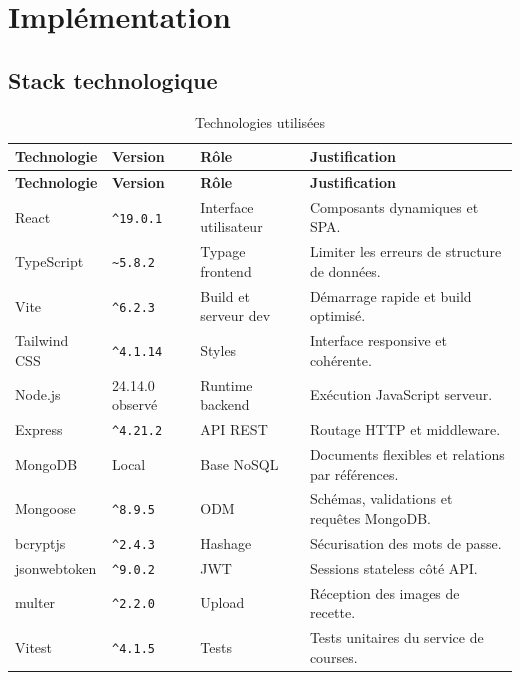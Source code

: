 \documentclass[12pt,a4paper]{report}
\begin{document}
\chapter{Implémentation}
\section{Stack technologique}
\begin{longtable}{p{2.8cm}p{2.2cm}p{4.4cm}p{5cm}}
\caption{Technologies utilisées}\label{tab:stack}\\
\toprule
\textbf{Technologie} & \textbf{Version} & \textbf{Rôle} & \textbf{Justification} \\
\midrule
\endfirsthead
\toprule
\textbf{Technologie} & \textbf{Version} & \textbf{Rôle} & \textbf{Justification} \\
\midrule
\endhead
React & \texttt{\^{}19.0.1} & Interface utilisateur & Composants dynamiques et SPA. \\
TypeScript & \texttt{\~{}5.8.2} & Typage frontend & Limiter les erreurs de structure de données. \\
Vite & \texttt{\^{}6.2.3} & Build et serveur dev & Démarrage rapide et build optimisé. \\
Tailwind CSS & \texttt{\^{}4.1.14} & Styles & Interface responsive et cohérente. \\
Node.js & 24.14.0 observé & Runtime backend & Exécution JavaScript serveur. \\
Express & \texttt{\^{}4.21.2} & API REST & Routage HTTP et middleware. \\
MongoDB & Local & Base NoSQL & Documents flexibles et relations par références. \\
Mongoose & \texttt{\^{}8.9.5} & ODM & Schémas, validations et requêtes MongoDB. \\
bcryptjs & \texttt{\^{}2.4.3} & Hashage & Sécurisation des mots de passe. \\
jsonwebtoken & \texttt{\^{}9.0.2} & JWT & Sessions stateless côté API. \\
multer & \texttt{\^{}2.2.0} & Upload & Réception des images de recette. \\
Vitest & \texttt{\^{}4.1.5} & Tests & Tests unitaires du service de courses. \\
\bottomrule
\end{longtable}
\end{document}
